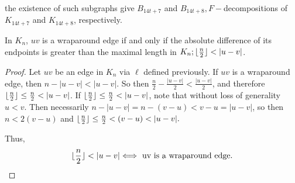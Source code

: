 \begin{construction}
    \begin{center}
    the existence of such subgraphs give $B_{14t+7}$ and $B_{14t+8},F-$decompositions of $K_{14t+7}$ and $K_{14t+8}$, respectively.
    \end{center}
    
\end{construction}

\begin{thm} \label{wraplarger}
In $K_{n}$, $uv$ is a wraparound edge if and only if the absolute difference of its endpoints is greater than the maximal length in $K_{n};\floor{\frac{n}{2}}<|u-v|$. 
\begin{proof}
    Let $uv$ be an edge in $K_{n}$ via $\ell$ defined previously. If $uv$ is a wraparound edge, then $n-|u-v|<|u-v|$. So then $\frac{n}{2}-\frac{|u-v|}{2}<\frac{|u-v|}{2}$, and therefore $\floor{\frac{n}{2}}\leq \frac{n}{2}<|u-v|$. If $\floor{\frac{n}{2}}\leq \frac{n}{2}<|u-v|$, note that without loss of generality $u<v$. Then necessarily $n-|u-v|=n-(v-u)<v-u=|u-v|$, so then $n<2(v-u)$ and $\floor{\frac{n}{2}}\leq\frac{n}{2}<(v-u)<|u-v|.$

    Thus,
    $$\floor{\frac{n}{2}}<|u-v|\Longleftrightarrow\text{ uv is a wraparound edge.}$$
\end{proof}
\end{thm}
\newpage

